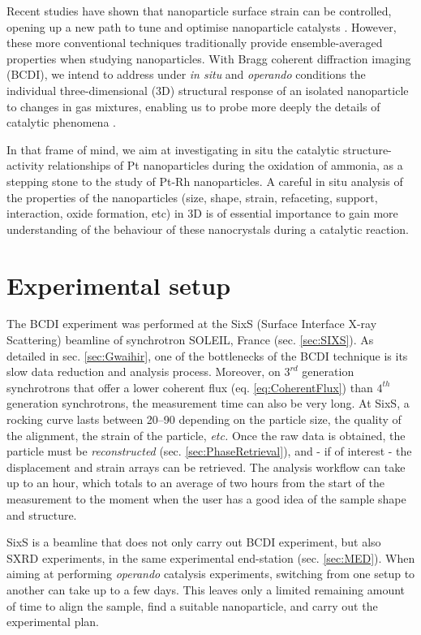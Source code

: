 Recent studies have shown that nanoparticle surface strain can be controlled, opening up a new path to tune and optimise nanoparticle catalysts \parencite{Zhang2014, Sneed2015, Wang2016}.
However, these more conventional techniques traditionally provide ensemble-averaged properties when studying nanoparticles.
With Bragg coherent diffraction imaging (BCDI), we intend to address under \textit{in situ} and \textit{operando} conditions the individual three-dimensional (3D) structural response of an isolated nanoparticle to changes in gas mixtures, enabling us to probe more deeply the details of catalytic phenomena \parencite{Fernandez2019, Passos2020, Dupraz2022}.

In that frame of mind, we aim at investigating in situ the catalytic structure-activity relationships of Pt nanoparticles during the oxidation of ammonia, as a stepping stone to the study of Pt-Rh nanoparticles.
A careful in situ analysis of the properties of the nanoparticles (size, shape, strain, refaceting, support, interaction, oxide formation, etc) in 3D is of essential importance to gain more understanding of the behaviour of these nanocrystals during a catalytic reaction.

\section{Experimental setup}\label{sec:BCDISetup}

The BCDI experiment was performed at the SixS (Surface Interface X-ray Scattering) beamline of synchrotron SOLEIL, France (sec. \ref{sec:SIXS}).
As detailed in sec. \ref{sec:Gwaihir}, one of the bottlenecks of the BCDI technique is its slow data reduction and analysis process.
Moreover, on $3^{rd}$ generation synchrotrons that offer a lower coherent flux (eq. \ref{eq:CoherentFlux}) than $4^{th}$ generation synchrotrons, the measurement time can also be very long.
At SixS, a rocking curve lasts between \qtyrange{20}{90}{\min} depending on the particle size, the quality of the alignment, the strain of the particle, \textit{etc.}
Once the raw data is obtained, the particle must be \textit{reconstructed} (sec. \ref{sec:PhaseRetrieval}), and - if of interest - the displacement and strain arrays can be retrieved.
The analysis workflow can take up to an hour, which totals to an average of two hours from the start of the measurement to the moment when the user has a good idea of the sample shape and structure.

SixS is a beamline that does not only carry out BCDI experiment, but also SXRD experiments, in the same experimental end-station (sec. \ref{sec:MED}).
When aiming at performing \textit{operando} catalysis experiments, switching from one setup to another can take up to a few days.
This leaves only a limited remaining amount of time to align the sample, find a suitable nanoparticle, and carry out the experimental plan.

